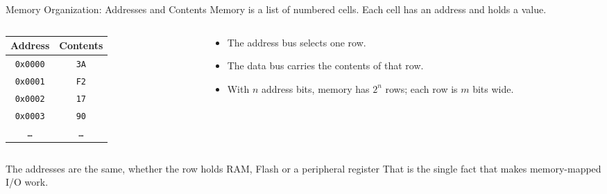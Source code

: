 \documentclass[9pt,aspectratio=169,xcolor=table]{beamer}
\begin{document}
\begin{frame}{Memory Organization: Addresses and Contents}
    \leavevmode
    {\small Memory is a list of numbered cells. Each cell has an
    \alert{address} and holds a value.}

    \vspace{3mm}
    \begin{columns}[c]
    \begin{column}{0.45\textwidth}
        \centering
        {\small
        \begin{tabular}{@{}c c@{}}
            \toprule
            \textbf{Address} & \textbf{Contents} \\
            \midrule
            \texttt{0x0000} & \texttt{3A} \\
            \texttt{0x0001} & \texttt{F2} \\
            \texttt{0x0002} & \texttt{17} \\
            \texttt{0x0003} & \texttt{90} \\
            \texttt{\ldots} & \texttt{\ldots} \\
            \bottomrule
        \end{tabular}}
    \end{column}
    \begin{column}{0.50\textwidth}
        {\small
        \begin{itemize}\itemsep5pt
            \item The \alert{address bus} selects one row.
            \item The \alert{data bus} carries the contents of that row.
            \item With $n$ address bits, memory has $2^n$ rows; each
                  row is $m$ bits wide.
        \end{itemize}}
    \end{column}
    \end{columns}

    \vspace{3mm}
    \begin{block}{The addresses are the same, whether the row holds RAM, Flash or a peripheral register}
        {\small That is the single fact that makes memory-mapped I/O work.}
    \end{block}
\end{frame}
\end{document}
